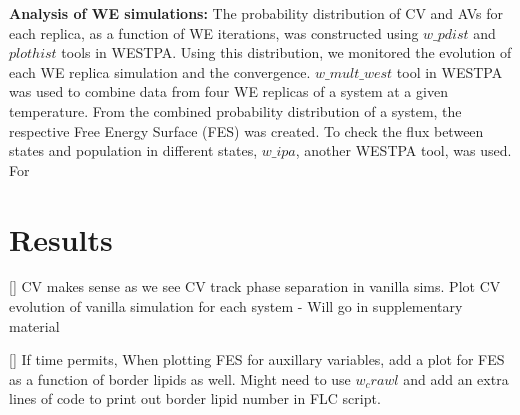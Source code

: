 \documentclass{biophys-new}
\begin{document}
\textbf{Analysis of WE simulations:}
The probability distribution of CV and AVs for each replica, as a function of WE iterations, was constructed using $w\_pdist$ and $plothist$ tools in WESTPA.
Using this distribution, we monitored the evolution of each WE replica simulation and the convergence.
$w\_mult\_west$ tool in WESTPA was used to combine data from four WE replicas of a system at a given temperature.
From the combined probability distribution of a system, the respective Free Energy Surface (FES) was created.
To check the flux between states and population in different states, $w\_ipa$, another WESTPA tool, was used.
For 



\section*{Results}

[] CV makes sense as we see CV track phase separation in vanilla sims.
Plot CV evolution of vanilla simulation for each system - Will go in supplementary material

[] If time permits, When plotting FES for auxillary variables, add a plot for FES as a function of border lipids as well.
Might need to use $w_crawl$ and add an extra lines of code to print out border lipid number in FLC script.



\end{document}
